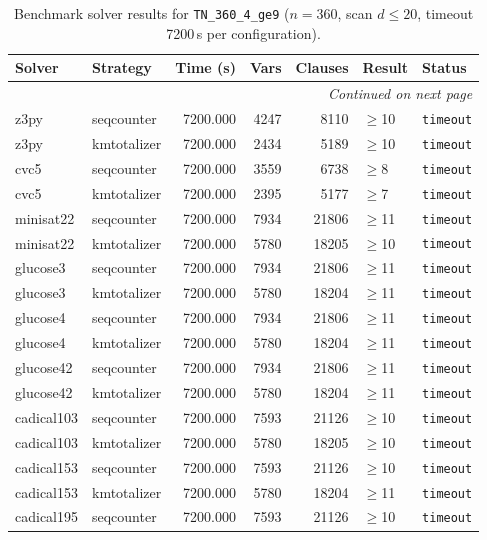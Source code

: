 \begin{longtable}{llrrrl p{}}
\caption{Benchmark solver results for \texttt{TN\_360\_4\_ge9} ($n=360$, scan $d \leq 20$, timeout 7200\,s per configuration).} \label{tab:bench-TN_360_4_ge9} \\
\toprule
Solver & Strategy & Time (s) & Vars & Clauses & Result & Status \\
\midrule
\endhead
\midrule
\multicolumn{7}{r}{\textit{Continued on next page}} \\
\midrule
\endfoot
\bottomrule
\endlastfoot
z3py & seqcounter & 7200.000 & 4247 & 8110 & $\geq$10 & \texttt{timeout} \\
z3py & kmtotalizer & 7200.000 & 2434 & 5189 & $\geq$10 & \texttt{timeout} \\
cvc5 & seqcounter & 7200.000 & 3559 & 6738 & $\geq$8 & \texttt{timeout} \\
cvc5 & kmtotalizer & 7200.000 & 2395 & 5177 & $\geq$7 & \texttt{timeout} \\
minisat22 & seqcounter & 7200.000 & 7934 & 21806 & $\geq$11 & \texttt{timeout} \\
minisat22 & kmtotalizer & 7200.000 & 5780 & 18205 & $\geq$10 & \texttt{timeout} \\
glucose3 & seqcounter & 7200.000 & 7934 & 21806 & $\geq$11 & \texttt{timeout} \\
glucose3 & kmtotalizer & 7200.000 & 5780 & 18204 & $\geq$11 & \texttt{timeout} \\
glucose4 & seqcounter & 7200.000 & 7934 & 21806 & $\geq$11 & \texttt{timeout} \\
glucose4 & kmtotalizer & 7200.000 & 5780 & 18204 & $\geq$11 & \texttt{timeout} \\
glucose42 & seqcounter & 7200.000 & 7934 & 21806 & $\geq$11 & \texttt{timeout} \\
glucose42 & kmtotalizer & 7200.000 & 5780 & 18204 & $\geq$11 & \texttt{timeout} \\
cadical103 & seqcounter & 7200.000 & 7593 & 21126 & $\geq$10 & \texttt{timeout} \\
cadical103 & kmtotalizer & 7200.000 & 5780 & 18205 & $\geq$10 & \texttt{timeout} \\
cadical153 & seqcounter & 7200.000 & 7593 & 21126 & $\geq$10 & \texttt{timeout} \\
cadical153 & kmtotalizer & 7200.000 & 5780 & 18204 & $\geq$11 & \texttt{timeout} \\
cadical195 & seqcounter & 7200.000 & 7593 & 21126 & $\geq$10 & \texttt{timeout} \\

\end{longtable}
